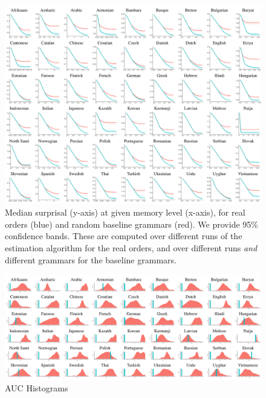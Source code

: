 \begin{figure}
	\begin{center}
\includegraphics[width=\textwidth]{results-table.pdf}
\end{center}
	\caption{Median surprisal (y-axis) at given memory level (x-axis), for real orders (blue) and random baseline grammars (red). We provide 95\% confidence bands. These are computed over different runs of the estimation algorithm for the real orders, and over different runs \emph{and} different grammars for the baseline grammars.}\label{fig:median-table}
\end{figure}


\begin{figure}
	\begin{center}
\includegraphics[width=\textwidth]{auc-table.pdf}
\end{center}
	\caption{AUC Histograms}\label{fig:auc}
\end{figure}





